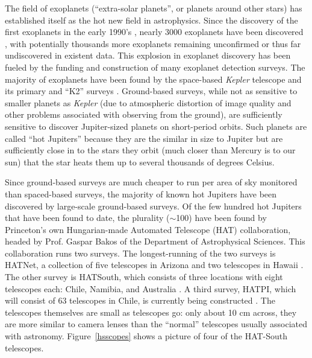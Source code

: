
The field of exoplanets (``extra-solar planets'', or planets around other stars) has established itself as the hot new field in astrophysics. Since the discovery of the first exoplanets in the early 1990's \cite{pulsarplanet}, nearly 3000 exoplanets have been discovered \cite{exoplanetorg}, with potentially thousands more exoplanets remaining unconfirmed or thus far undiscovered in existent data.  This explosion in exoplanet discovery has been fueled by the funding and construction of many exoplanet detection surveys.  The majority of exoplanets have been found by the space-based {\it Kepler} telescope and its primary \cite{kepler} and ``K2'' surveys \cite{k2}.  Ground-based surveys, while not as sensitive to smaller planets as {\it Kepler} (due to atmospheric distortion of image quality and other problems associated with observing from the ground), are sufficiently sensitive to discover Jupiter-sized planets on short-period orbits.  Such planets are called ``hot Jupiters'' because they are the similar in size to Jupiter but are sufficiently close in to the stars they orbit (much closer than Mercury is to our sun) that the star heats them up to several thousands of degrees Celsius.

  Since ground-based surveys are much cheaper to run per area of sky monitored than spaced-based surveys, the majority of known hot Jupiters have been discovered by large-scale ground-based surveys.
Of the few hundred hot Jupiters that have been found to date, the plurality (${\sim}$100) have been found by Princeton's own Hungarian-made Automated Telescope (HAT) collaboration, headed by Prof. Gaspar Bakos of the Department of Astrophysical Sciences.  This collaboration runs two surveys. The longest-running of the two surveys is HATNet, a collection of five telescopes in Arizona and two telescopes in Hawaii \cite{hatnet}.  The other survey is HATSouth, which consists of three locations with eight telescopes each: Chile, Namibia, and Australia \cite{hatsouth}.  A third survey, HATPI, which will consist of 63 telescopes in Chile, is currently being constructed \cite{hatpi}.  The telescopes themselves are small as telescopes go: only about 10 cm across, they are more similar to camera lenses than the ``normal'' telescopes usually associated with astronomy.  Figure~\ref{hsscopes} shows a picture of four of the HAT-South telescopes.

